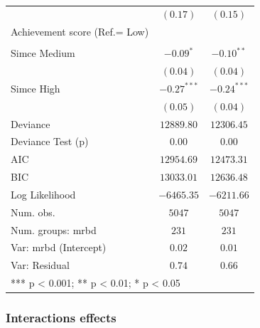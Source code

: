 \documentclass[
  letterpaper,
  DIV=11,
  numbers=noendperiod]{scrartcl}
\begin{document}
\begin{table}
{\begin{center}
\begin{tabular}{l c c}
                                         & $(0.17)$      & $(0.15)$      \\
Achievement score (Ref.= Low)            &               &               \\
                                         &               &               \\
\quad Simce Medium                       & $-0.09^{*}$   & $-0.10^{**}$  \\
                                         & $(0.04)$      & $(0.04)$      \\
\quad Simce High                         & $-0.27^{***}$ & $-0.24^{***}$ \\
                                         & $(0.05)$      & $(0.04)$      \\
\hline
Deviance                                 & $12889.80$    & $12306.45$    \\
Deviance Test (p)                        & $0.00$        & $0.00$        \\
AIC                                      & $12954.69$    & $12473.31$    \\
BIC                                      & $13033.01$    & $12636.48$    \\
Log Likelihood                           & $-6465.35$    & $-6211.66$    \\
Num. obs.                                & $5047$        & $5047$        \\
Num. groups: mrbd                        & $231$         & $231$         \\
Var: mrbd (Intercept)                    & $0.02$        & $0.01$        \\
Var: Residual                            & $0.74$        & $0.66$        \\
\hline
\multicolumn{3}{l}{\scriptsize{*** p < 0.001; ** p < 0.01; * p < 0.05}}
\end{tabular}
\caption{}
\label{table:coefficients}
\end{center}

}

\end{table}%

\subsubsection{Interactions effects}\label{interactions-effects}
\end{document}
